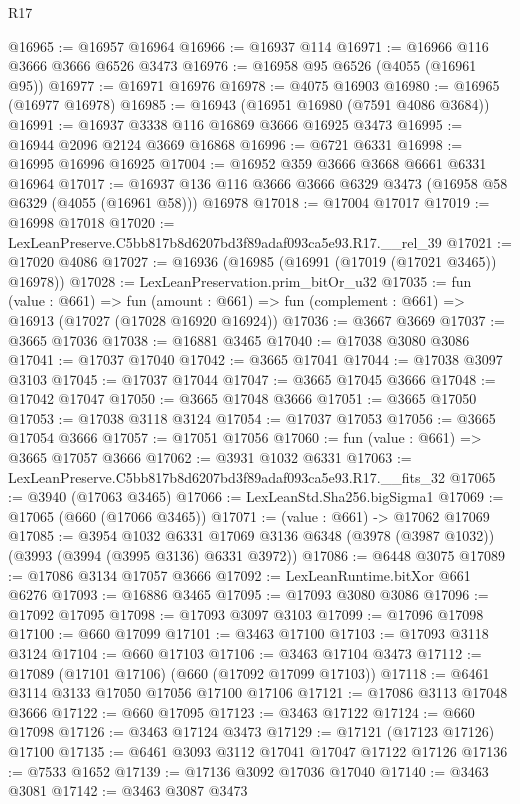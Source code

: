 \begin{lexlean}{R17}
\begin{coremodule}
@16965 := @16957 @16964
@16966 := @16937 @114
@16971 := @16966 @116 @3666 @3666 @6526 @3473
@16976 := @16958 @95 @6526 (@4055 (@16961 @95))
@16977 := @16971 @16976
@16978 := @4075 @16903
@16980 := @16965 (@16977 @16978)
@16985 := @16943 (@16951 @16980 (@7591 @4086 @3684))
@16991 := @16937 @3338 @116 @16869 @3666 @16925 @3473
@16995 := @16944 @2096 @2124 @3669 @16868
@16996 := @6721 @6331
@16998 := @16995 @16996 @16925
@17004 := @16952 @359 @3666 @3668 @6661 @6331 @16964
@17017 := @16937 @136 @116 @3666 @3666 @6329 @3473 (@16958 @58 @6329 (@4055 (@16961 @58))) @16978
@17018 := @17004 @17017
@17019 := @16998 @17018
@17020 := LexLeanPreserve.C5bb817b8d6207bd3f89adaf093ca5e93.R17.__rel_39
@17021 := @17020 @4086
@17027 := @16936 (@16985 (@16991 (@17019 (@17021 @3465)) @16978))
@17028 := LexLeanPreservation.prim_bitOr_u32
@17035 := fun (value : @661) =>
  fun (amount : @661) => fun (complement : @661) => @16913 (@17027 (@17028 @16920 @16924))
@17036 := @3667 @3669
@17037 := @3665 @17036
@17038 := @16881 @3465
@17040 := @17038 @3080 @3086
@17041 := @17037 @17040
@17042 := @3665 @17041
@17044 := @17038 @3097 @3103
@17045 := @17037 @17044
@17047 := @3665 @17045 @3666
@17048 := @17042 @17047
@17050 := @3665 @17048 @3666
@17051 := @3665 @17050
@17053 := @17038 @3118 @3124
@17054 := @17037 @17053
@17056 := @3665 @17054 @3666
@17057 := @17051 @17056
@17060 := fun (value : @661) => @3665 @17057 @3666
@17062 := @3931 @1032 @6331
@17063 := LexLeanPreserve.C5bb817b8d6207bd3f89adaf093ca5e93.R17.__fits_32
@17065 := @3940 (@17063 @3465)
@17066 := LexLeanStd.Sha256.bigSigma1
@17069 := @17065 (@660 (@17066 @3465))
@17071 := (value : @661) -> @17062 @17069
@17085 := @3954
    @1032
    @6331
    @17069
    @3136
    @6348
    (@3978 (@3987 @1032))
    (@3993 (@3994 (@3995 @3136) @6331 @3972))
@17086 := @6448 @3075
@17089 := @17086 @3134 @17057 @3666
@17092 := LexLeanRuntime.bitXor @661 @6276
@17093 := @16886 @3465
@17095 := @17093 @3080 @3086
@17096 := @17092 @17095
@17098 := @17093 @3097 @3103
@17099 := @17096 @17098
@17100 := @660 @17099
@17101 := @3463 @17100
@17103 := @17093 @3118 @3124
@17104 := @660 @17103
@17106 := @3463 @17104 @3473
@17112 := @17089 (@17101 @17106) (@660 (@17092 @17099 @17103))
@17118 := @6461 @3114 @3133 @17050 @17056 @17100 @17106
@17121 := @17086 @3113 @17048 @3666
@17122 := @660 @17095
@17123 := @3463 @17122
@17124 := @660 @17098
@17126 := @3463 @17124 @3473
@17129 := @17121 (@17123 @17126) @17100
@17135 := @6461 @3093 @3112 @17041 @17047 @17122 @17126
@17136 := @7533 @1652
@17139 := @17136 @3092 @17036 @17040
@17140 := @3463 @3081
@17142 := @3463 @3087 @3473

\end{coremodule}
\end{lexlean}
